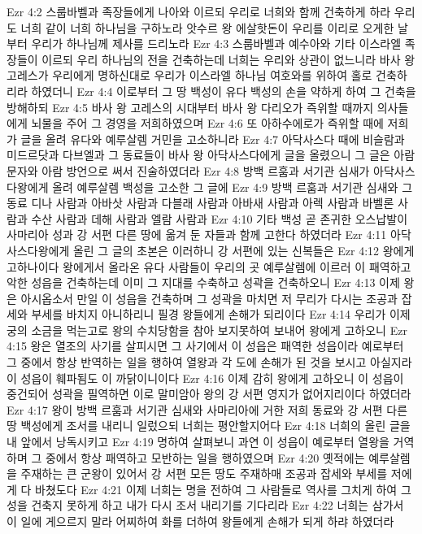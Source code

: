 Ezr 4:2  스룹바벨과 족장들에게 나아와 이르되 우리로 너희와 함께 건축하게 하라 우리도 너희 같이 너희 하나님을 구하노라 앗수르 왕 에살핫돈이 우리를 이리로 오게한 날부터 우리가 하나님께 제사를 드리노라
Ezr 4:3  스룹바벨과 예수아와 기타 이스라엘 족장들이 이르되 우리 하나님의 전을 건축하는데 너희는 우리와 상관이 없느니라 바사 왕 고레스가 우리에게 명하신대로 우리가 이스라엘 하나님 여호와를 위하여 홀로 건축하리라 하였더니
Ezr 4:4  이로부터 그 땅 백성이 유다 백성의 손을 약하게 하여 그 건축을 방해하되
Ezr 4:5  바사 왕 고레스의 시대부터 바사 왕 다리오가 즉위할 때까지 의사들에게 뇌물을 주어 그 경영을 저희하였으며
Ezr 4:6  또 아하수에로가 즉위할 때에 저희가 글을 올려 유다와 예루살렘 거민을 고소하니라
Ezr 4:7  아닥사스다 때에 비슬람과 미드르닷과 다브엘과 그 동료들이 바사 왕 아닥사스다에게 글을 올렸으니 그 글은 아람 문자와 아람 방언으로 써서 진술하였더라
Ezr 4:8  방백 르훔과 서기관 심새가 아닥사스다왕에게 올려 예루살렘 백성을 고소한 그 글에
Ezr 4:9  방백 르훔과 서기관 심새와 그 동료 디나 사람과 아바삿 사람과 다블래 사람과 아바새 사람과 아렉 사람과 바벨론 사람과 수산 사람과 데해 사람과 엘람 사람과
Ezr 4:10  기타 백성 곧 존귀한 오스납발이 사마리아 성과 강 서편 다른 땅에 옮겨 둔 자들과 함께 고한다 하였더라
Ezr 4:11  아닥사스다왕에게 올린 그 글의 초본은 이러하니 강 서편에 있는 신복들은
Ezr 4:12  왕에게 고하나이다 왕에게서 올라온 유다 사람들이 우리의 곳 예루살렘에 이르러 이 패역하고 악한 성읍을 건축하는데 이미 그 지대를 수축하고 성곽을 건축하오니
Ezr 4:13  이제 왕은 아시옵소서 만일 이 성읍을 건축하며 그 성곽을 마치면 저 무리가 다시는 조공과 잡세와 부세를 바치지 아니하리니 필경 왕들에게 손해가 되리이다
Ezr 4:14  우리가 이제 궁의 소금을 먹는고로 왕의 수치당함을 참아 보지못하여 보내어 왕에게 고하오니
Ezr 4:15  왕은 열조의 사기를 살피시면 그 사기에서 이 성읍은 패역한 성읍이라 예로부터 그 중에서 항상 반역하는 일을 행하여 열왕과 각 도에 손해가 된 것을 보시고 아실지라 이 성읍이 훼파됨도 이 까닭이니이다
Ezr 4:16  이제 감히 왕에게 고하오니 이 성읍이 중건되어 성곽을 필역하면 이로 말미암아 왕의 강 서편 영지가 없어지리이다 하였더라
Ezr 4:17  왕이 방백 르훔과 서기관 심새와 사마리아에 거한 저희 동료와 강 서편 다른 땅 백성에게 조서를 내리니 일렀으되 너희는 평안할지어다
Ezr 4:18  너희의 올린 글을 내 앞에서 낭독시키고
Ezr 4:19  명하여 살펴보니 과연 이 성읍이 예로부터 열왕을 거역하며 그 중에서 항상 패역하고 모반하는 일을 행하였으며
Ezr 4:20  옛적에는 예루살렘을 주재하는 큰 군왕이 있어서 강 서편 모든 땅도 주재하매 조공과 잡세와 부세를 저에게 다 바쳤도다
Ezr 4:21  이제 너희는 명을 전하여 그 사람들로 역사를 그치게 하여 그 성을 건축지 못하게 하고 내가 다시 조서 내리기를 기다리라
Ezr 4:22  너희는 삼가서 이 일에 게으르지 말라 어찌하여 화를 더하여 왕들에게 손해가 되게 하랴 하였더라
